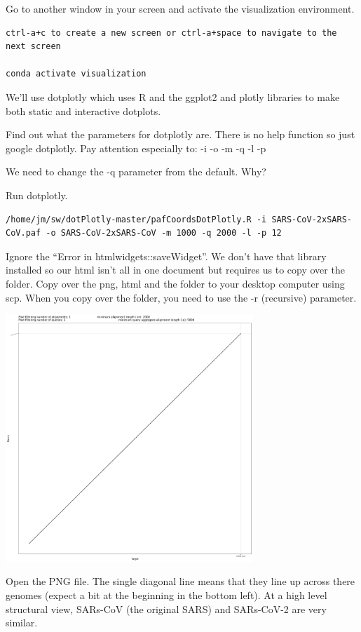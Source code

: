 \documentclass[
]{book}
\begin{document}
Go to another window in your screen and activate the visualization environment.

\begin{verbatim}
ctrl-a+c to create a new screen or ctrl-a+space to navigate to the next screen

conda activate visualization
\end{verbatim}

We'll use dotplotly which uses R and the ggplot2 and plotly libraries to make both static and interactive dotplots.

Find out what the parameters for dotplotly are. There is no help function so just google dotplotly. Pay attention especially to:
-i
-o
-m
-q
-l
-p

We need to change the -q parameter from the default. Why?

Run dotplotly.

\begin{verbatim}
/home/jm/sw/dotPlotly-master/pafCoordsDotPlotly.R -i SARS-CoV-2xSARS-CoV.paf -o SARS-CoV-2xSARS-CoV -m 1000 -q 2000 -l -p 12
\end{verbatim}

Ignore the ``Error in htmlwidgets::saveWidget''. We don't have that library installed so our html isn't all in one document but requires us to copy over the folder. Copy over the png, html and the folder to your desktop computer using scp. When you copy over the folder, you need to use the -r (recursive) parameter.

\includegraphics[width=0.7\textwidth,height=\textheight]{./Figures/SARS-CoV-2xSARS-CoV.png}

Open the PNG file. The single diagonal line means that they line up across there genomes (expect a bit at the beginning in the bottom left). At a high level structural view, SARs-CoV (the original SARS) and SARs-CoV-2 are very similar.
\end{document}
